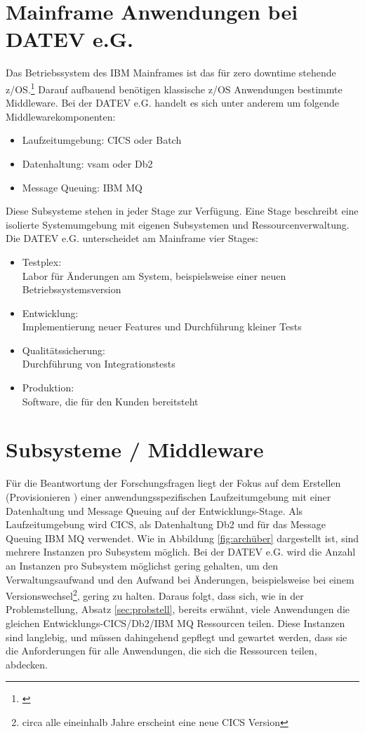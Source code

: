 \section{Mainframe Anwendungen bei DATEV e.G.}\label{sec:zosanw}
Das Betriebssystem des IBM Mainframes ist das für zero downtime stehende z/OS.\footnote{\cite{Ebbers.2011}}
Darauf aufbauend benötigen klassische z/OS Anwendungen bestimmte Middleware.
Bei der DATEV e.G. handelt es sich unter anderem um folgende Middlewarekomponenten:

\begin{itemize}
\item Laufzeitumgebung: CICS oder \Gls{Batch}
\item Datenhaltung: \Gls{vsam} oder Db2
\item Message Queuing: IBM MQ
\end{itemize}

Diese Subsysteme stehen in jeder Stage zur Verfügung.
Eine Stage beschreibt eine isolierte Systemumgebung mit eigenen Subsystemen und Ressourcenverwaltung.
Die DATEV e.G. unterscheidet am Mainframe vier Stages:
\begin{samepage}
\begin{itemize}
\item Testplex:\\
Labor für Änderungen am System, beispielsweise einer neuen Betriebssystemsversion
\item Entwicklung:\\
Implementierung neuer Features und Durchführung kleiner Tests
\item Qualitätssicherung:\\
Durchführung von Integrationstests
\item Produktion:\\
Software, die für den Kunden bereitsteht
\end{itemize}
\end{samepage}

\section{Subsysteme / Middleware}
Für die Beantwortung der Forschungsfragen liegt der Fokus auf dem Erstellen (\glqq Provisionieren \grqq) einer anwendungsspezifischen Laufzeitumgebung mit einer Datenhaltung und Message Queuing auf der Entwicklungs-Stage.
Als Laufzeitumgebung wird \glqq CICS\grqq, als Datenhaltung \glqq Db2\grqq{} und für das Message Queuing \glqq IBM MQ\grqq{} verwendet.
Wie in Abbildung \ref{fig:archüber} dargestellt ist, sind mehrere Instanzen pro Subsystem möglich.
Bei der DATEV e.G. wird die Anzahl an Instanzen pro Subsystem möglichst gering gehalten, um den Verwaltungsaufwand und den Aufwand bei Änderungen, beispielsweise bei einem Versionswechsel\footnote{circa alle eineinhalb Jahre erscheint eine neue CICS Version}, gering zu halten.
Daraus folgt, dass sich, wie in der Problemstellung, Absatz \ref{sec:probstell}, bereits erwähnt, viele Anwendungen die gleichen Entwicklungs-CICS/Db2/IBM MQ Ressourcen teilen.
Diese Instanzen sind langlebig, und müssen dahingehend gepflegt und gewartet werden, dass sie die Anforderungen für alle Anwendungen, die sich die Ressourcen teilen, abdecken. 

